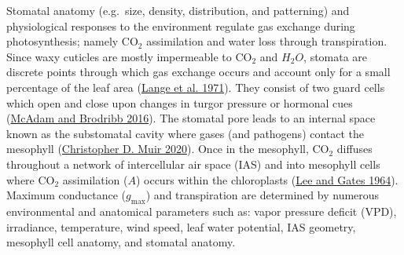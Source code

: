 \documentclass[12pt,halfline,a4paper,]{ouparticle}
\begin{document}
Stomatal anatomy (e.g.~size, density, distribution, and patterning) and
physiological responses to the environment regulate gas exchange during
photosynthesis; namely CO\(_2\) assimilation and water loss through
transpiration. Since waxy cuticles are mostly impermeable to CO\(_2\)
and \(H_2O\), stomata are discrete points through which gas exchange
occurs and account only for a small percentage of the leaf area
(\protect\hyperlink{ref-lange_responses_1971}{Lange et al. 1971}). They
consist of two guard cells which open and close upon changes in turgor
pressure or hormonal cues
(\protect\hyperlink{ref-mcadam_linking_2016}{McAdam and Brodribb 2016}).
The stomatal pore leads to an internal space known as the substomatal
cavity where gases (and pathogens) contact the mesophyll
(\protect\hyperlink{ref-muir_stomatal_2020}{Christopher D. Muir 2020}).
Once in the mesophyll, CO\(_2\) diffuses throughout a network of
intercellular air space (IAS) and into mesophyll cells where CO\(_2\)
assimilation (\(A\)) occurs within the chloroplasts
(\protect\hyperlink{ref-lee_diffusion_1964}{Lee and Gates 1964}).
Maximum conductance (\(g_\text{max}\)) and transpiration are determined
by numerous environmental and anatomical parameters such as: vapor
pressure deficit (VPD), irradiance, temperature, wind speed, leaf water
potential, IAS geometry, mesophyll cell anatomy, and stomatal anatomy.
\end{document}
